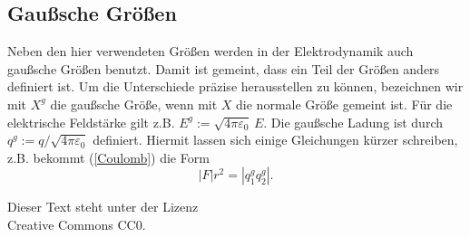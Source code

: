 \documentclass[a4paper,11pt,fleqn,twocolumn,twoside,dvipdfmx]{scrartcl}
\begin{document}
\subsection{Gaußsche Größen}
Neben den hier verwendeten Größen werden in der Elektrodynamik
auch gaußsche Größen benutzt. Damit ist gemeint, dass ein Teil
der Größen anders definiert ist. Um die Unterschiede präzise
herausstellen zu können, bezeichnen wir mit $X^g$ die gaußsche Größe,
wenn mit $X$ die normale Größe gemeint ist.
Für die elektrische Feldstärke gilt z.B.
$E^g := \sqrt{4\pi\varepsilon_0}\,E$.
Die gaußsche Ladung ist durch
$q^g:=q/\sqrt{4\pi\varepsilon_0}$ definiert. Hiermit lassen
sich einige Gleichungen kürzer schreiben, z.B. bekommt
(\ref{Coulomb}) die Form
\begin{equation}
|F|r^2 = |q_1^g q_2^g|.
\end{equation}

\vfill
\noindent
Dieser Text steht unter der Lizenz\\
Creative Commons CC0.
\end{document}
